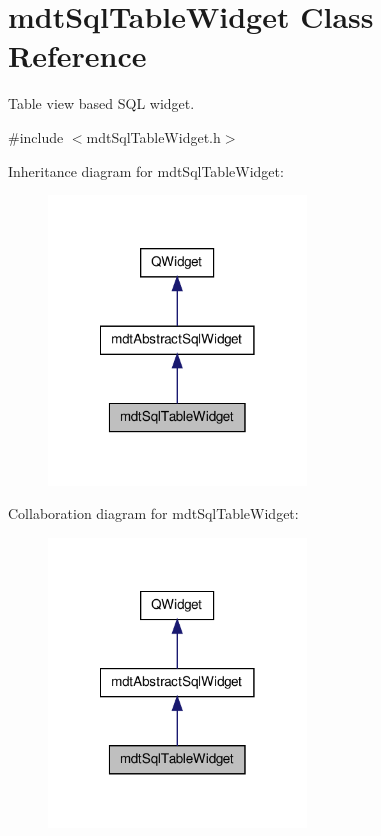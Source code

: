 \hypertarget{classmdt_sql_table_widget}{\section{mdt\-Sql\-Table\-Widget Class Reference}
\label{classmdt_sql_table_widget}
}


Table view based S\-Q\-L widget.  




{\ttfamily \#include $<$mdt\-Sql\-Table\-Widget.\-h$>$}



Inheritance diagram for mdt\-Sql\-Table\-Widget\-:
\nopagebreak
\begin{figure}[H]
\begin{center}
\leavevmode
\includegraphics[width=194pt]{classmdt_sql_table_widget__inherit__graph}
\end{center}
\end{figure}


Collaboration diagram for mdt\-Sql\-Table\-Widget\-:
\nopagebreak
\begin{figure}[H]
\begin{center}
\leavevmode
\includegraphics[width=194pt]{classmdt_sql_table_widget__coll__graph}
\end{center}
\end{figure}
